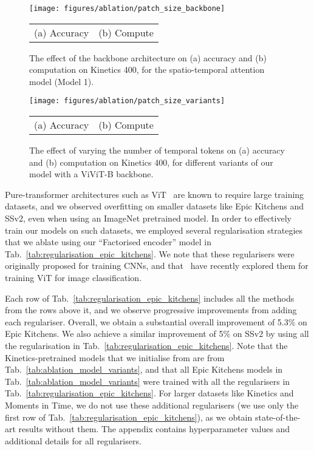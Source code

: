 \documentclass[10pt,twocolumn,letterpaper]{article}
\makeatletter
\renewcommand{\paragraph}{\@startsection{paragraph}{4}{\z@}{1.625ex \@plus 1ex \@minus .2ex}{-1em}{\normalfont\normalsize\bfseries}}
\makeatother
\begin{document}
 
\begin{figure}[t]
	\centering
	\texttt{[image: figures/ablation/patch\_size\_backbone]}
	\footnotesize{
    	\begin{tabularx}{\linewidth}{YY}
    	    (a) Accuracy   &  (b) Compute
    	\end{tabularx}
	}
	\caption{The effect of the backbone architecture on (a) accuracy and (b) computation on Kinetics 400, for the spatio-temporal attention model (Model 1).
	}
	\label{fig:ablation_backbone}
	\vspace{-0.5\baselineskip}
\end{figure} 
\begin{figure}[t]
	\centering
	\texttt{[image: figures/ablation/patch\_size\_variants]}
	\\
	\footnotesize{
    	\begin{tabularx}{\linewidth}{YY}
    	    (a) Accuracy   &  (b) Compute
    	\end{tabularx}
	}
 	\vspace{-0.5\baselineskip}
	\caption{The effect of varying the number of temporal tokens on (a) accuracy and (b) computation on Kinetics 400, for different variants of our model with a ViViT-B backbone.
	}
	\label{fig:ablation_temporal_tokens}
	\vspace{-\baselineskip}
\end{figure}
 
\paragraph{Model regularisation}
Pure-transformer architectures such as ViT~\cite{dosovitskiy_iclr_2021} are known to require large training datasets, and we observed overfitting on smaller datasets like Epic Kitchens and SSv2, even when using an ImageNet pretrained model.
In order to effectively train our models on such datasets, we employed several regularisation strategies that we ablate using our ``Factorised encoder'' model in Tab.~\ref{tab:regularisation_epic_kitchens}.
We note that these regularisers were originally proposed for training CNNs, and that~\cite{touvron_arxiv_2020} have recently explored them for training ViT for image classification.

Each row of Tab.~\ref{tab:regularisation_epic_kitchens} includes all the methods from the rows above it, and we observe progressive improvements from adding each regulariser.
Overall, we obtain a substantial overall improvement of 5.3\% on Epic Kitchens. We also achieve a similar improvement of 5\% on SSv2 by using all the regularisation in Tab.~\ref{tab:regularisation_epic_kitchens}.
Note that the Kinetics-pretrained models that we initialise from are from Tab.~\ref{tab:ablation_model_variants}, and that all Epic Kitchens models in Tab.~\ref{tab:ablation_model_variants} were trained with all the regularisers in Tab.~\ref{tab:regularisation_epic_kitchens}.
For larger datasets like Kinetics and Moments in Time, we do not use these additional regularisers (we use only the first row of Tab.~\ref{tab:regularisation_epic_kitchens}), as we obtain state-of-the-art results without them.
The appendix contains hyperparameter values and additional details for all regularisers.
\end{document}
